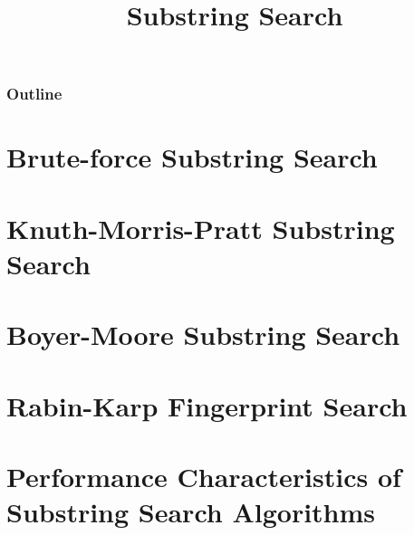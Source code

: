 \documentclass[8pt,a4paper,compress]{beamer}
\title{Substring Search}
\date{}
\begin{document}
\begin{frame}
\vfill
\titlepage
\end{frame}

\begin{frame}
\frametitle{Outline}
\tableofcontents
\end{frame}

\section{Brute-force Substring Search}
\begin{frame}[fragile]
\pause

\end{frame}

\section{Knuth-Morris-Pratt Substring Search}
\begin{frame}[fragile]
\pause

\end{frame}

\section{Boyer-Moore Substring Search}
\begin{frame}[fragile]
\pause

\end{frame}

\section{Rabin-Karp Fingerprint Search}
\begin{frame}[fragile]
\pause

\end{frame}

\section{Performance Characteristics of Substring Search Algorithms}
\begin{frame}[fragile]
\pause

\end{frame}
\end{document}
